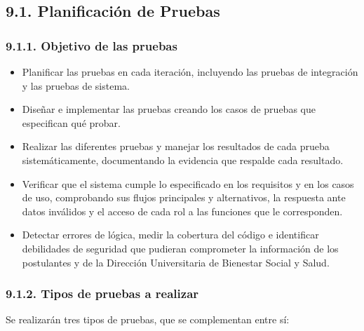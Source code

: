 \subsection{9.1. Planificación de Pruebas}\label{sec:cap9_planificacion}

\subsubsection{9.1.1. Objetivo de las pruebas}\label{sec:cap9_objetivo}

\begin{itemize}
    \item Planificar las pruebas en cada iteración, incluyendo las pruebas de integración y las pruebas de sistema.
    \item Diseñar e implementar las pruebas creando los casos de pruebas que especifican qué probar.
    \item Realizar las diferentes pruebas y manejar los resultados de cada prueba sistemáticamente, documentando la evidencia que respalde cada resultado.
    \item Verificar que el sistema cumple lo especificado en los requisitos y en los casos de uso, comprobando sus flujos principales y alternativos, la respuesta ante datos inválidos y el acceso de cada rol a las funciones que le corresponden.
    \item Detectar errores de lógica, medir la cobertura del código e identificar debilidades de seguridad que pudieran comprometer la información de los postulantes y de la Dirección Universitaria de Bienestar Social y Salud.
\end{itemize}

\subsubsection{9.1.2. Tipos de pruebas a realizar}\label{sec:cap9_tipos_pruebas}

Se realizarán tres tipos de pruebas, que se complementan entre sí:


